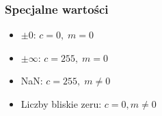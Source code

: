 \subsubsection*{Specjalne wartości}
\begin{itemize}
    \item \( \pm 0 \): \( c = 0,\; m = 0 \)
    \item \( \pm\infty \): \( c = 255,\; m = 0 \)
    \item NaN: \( c = 255,\; m \neq 0 \)
    \item Liczby bliskie zeru: \( c = 0, m \neq 0 \)
\end{itemize}
